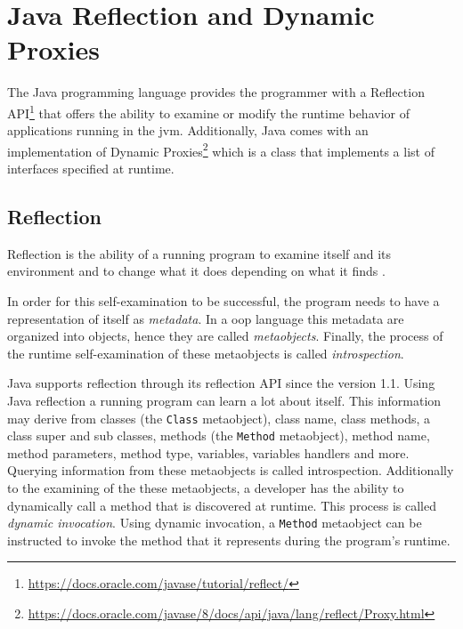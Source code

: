 \section{Java Reflection and Dynamic Proxies}\label{Java Reflection and Dynamic Proxies}
The Java programming language provides the programmer with a Reflection API\footnote{\url{https://docs.oracle.com/javase/tutorial/reflect/}} that offers the ability to examine or modify the runtime behavior of applications running in the \ac{jvm}. 
Additionally, Java comes with an implementation of Dynamic Proxies\footnote{\url{https://docs.oracle.com/javase/8/docs/api/java/lang/reflect/Proxy.html}} which is a class that implements a list of interfaces specified at runtime.

\subsection{Reflection}\label{Reflection}

Reflection is the ability of a running program to examine itself and its environment and to change what it does depending on what it finds \cite{forman2004java}.

In order for this self-examination to be successful, the program needs to have a representation of itself as \textit{metadata}.
In a \ac{oop} language this metadata are organized into objects, hence they are called \textit{metaobjects}. 
Finally, the process of the runtime self-examination of these metaobjects is called \textit{introspection}.

Java supports reflection through its reflection API since the version 1.1.
Using Java reflection a running program can learn a lot about itself. 
This information may derive from classes (the \texttt{Class} metaobject), class name, class methods, a class super and sub classes, methods (the \texttt{Method} metaobject), method name, method parameters, method type, variables, variables handlers and more. 
Querying information from these metaobjects is called introspection.
Additionally to the examining of the these metaobjects, a developer has the ability to dynamically call a method that is discovered at runtime. 
This process is called \textit{dynamic invocation}. 
Using dynamic invocation, a \texttt{Method} metaobject can be instructed to invoke the method that it represents during the program's runtime. 

